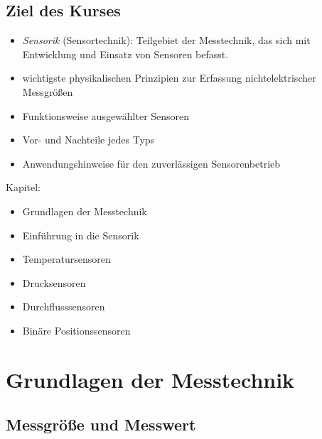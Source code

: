 \section{Ziel des Kurses}
\begin{itemize}
\item \emph{Sensorik} (Sensortechnik): Teilgebiet der Messtechnik, das sich mit Entwicklung und Einsatz von Sensoren befasst.
\item wichtigste physikalischen Prinzipien zur Erfassung nichtelektrischer Messgrößen
\item Funktionsweise ausgewählter Sensoren
\item Vor- und Nachteile jedes Typs
\item Anwendungshinweise für den zuverlässigen Sensorenbetrieb
\end{itemize}

Kapitel:
\begin{itemize}
\item Grundlagen der Messtechnik
\item Einführung in die Sensorik
\item Temperatursensoren
\item Drucksensoren
\item Durchflusssensoren
\item Binäre Positionssensoren
\end{itemize}

\chapter{Grundlagen der Messtechnik}

\section{Messgröße und Messwert}

